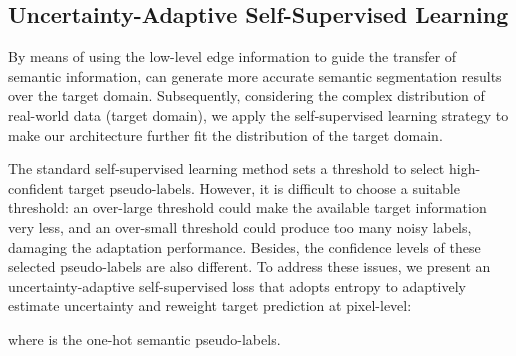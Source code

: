 \documentclass[sigconf]{acmart}
\begin{document}
\subsection{Uncertainty-Adaptive Self-Supervised Learning}
\par By means of using the low-level edge information to guide the transfer of semantic information,  can generate more accurate semantic segmentation results over the target domain. Subsequently, considering the complex distribution of real-world data (target domain), we apply the self-supervised learning strategy to make our architecture further fit the distribution of the target domain. 
\par The standard self-supervised learning method \cite{zou2018unsupervised,pan2020unsupervised} sets a threshold to select high-confident target pseudo-labels. However, it is difficult to choose a suitable threshold: an over-large threshold could make the available target information very less, and an over-small threshold could produce too many noisy labels, damaging the adaptation performance. Besides, the confidence levels of these selected pseudo-labels are also different. To address these issues, we present an uncertainty-adaptive self-supervised loss that adopts entropy to adaptively estimate uncertainty and reweight target prediction at pixel-level:

where  is the one-hot semantic pseudo-labels.
\end{document}

